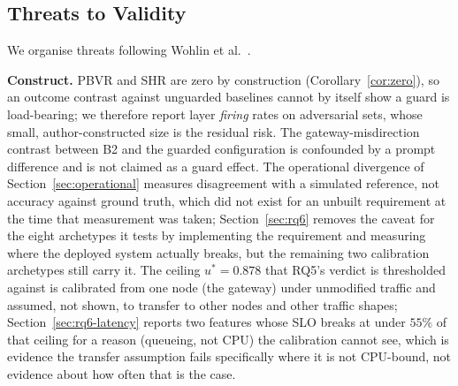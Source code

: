\documentclass[journal, 10pt]{IEEEtran}
\begin{document}
\subsection{Threats to Validity}
\label{sec:threats}
We organise threats following Wohlin et al.\ \cite{wohlin2012experimentation}.

\textbf{Construct.} PBVR and SHR are zero by construction
(Corollary~\ref{cor:zero}), so an outcome contrast against unguarded baselines
cannot by itself show a guard is load-bearing; we therefore report layer
\emph{firing} rates on adversarial sets, whose small, author-constructed size is
the residual risk. The gateway-misdirection contrast between B2 and the guarded
configuration is confounded by a prompt difference and is not claimed as a guard
effect. The operational divergence of Section~\ref{sec:operational} measures
disagreement with a simulated reference, not accuracy against ground truth, which
did not exist for an unbuilt requirement at the time that measurement was taken;
Section~\ref{sec:rq6} removes the caveat for the eight archetypes it tests by
implementing the requirement and measuring where the deployed system actually
breaks, but the remaining two calibration archetypes still carry it. The
ceiling $u^{*}=0.878$ that RQ5's verdict is thresholded against is calibrated
from one node (the gateway) under unmodified traffic and assumed, not shown, to
transfer to other nodes and other traffic shapes; Section~\ref{sec:rq6-latency}
reports two features whose SLO breaks at under $55\%$ of that ceiling for a
reason (queueing, not CPU) the calibration cannot see, which is evidence the
transfer assumption fails specifically where it is not CPU-bound, not evidence
about how often that is the case.
\end{document}
